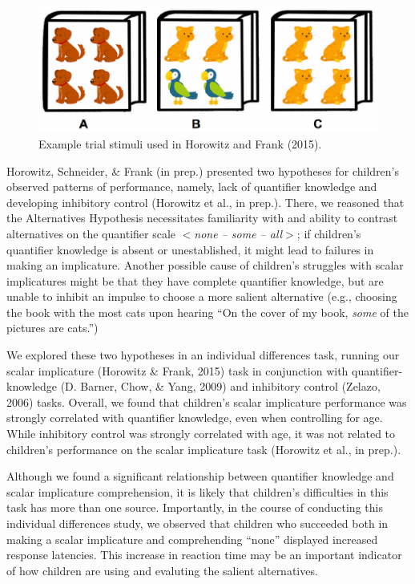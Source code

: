 \documentclass[10pt, letterpaper]{article}
\newenvironment{CodeChunk}{}{}
\begin{document}
\begin{CodeChunk}
\begin{figure}[b]

{\centering \includegraphics{figs/image-1} 

}

\caption[Example trial stimuli used in Horowitz and Frank (2015)]{Example trial stimuli used in Horowitz and Frank (2015).}\label{fig:image}
\end{figure}
\end{CodeChunk}

Horowitz, Schneider, \& Frank (in prep.) presented two hypotheses for
children's observed patterns of performance, namely, lack of quantifier
knowledge and developing inhibitory control (Horowitz et al., in prep.).
There, we reasoned that the Alternatives Hypothesis necessitates
familiarity with and ability to contrast alternatives on the quantifier
scale \(<\)\emph{none -- some -- all}\(>\); if children's quantifier
knowledge is absent or unestablished, it might lead to failures in
making an implicature. Another possible cause of children's struggles
with scalar implicatures might be that they have complete quantifier
knowledge, but are unable to inhibit an impulse to choose a more salient
alternative (e.g., choosing the book with the most cats upon hearing
``On the cover of my book, \emph{some} of the pictures are cats.'')

We explored these two hypotheses in an individual differences task,
running our scalar implicature (Horowitz \& Frank, 2015) task in
conjunction with quantifier-knowledge (D. Barner, Chow, \& Yang, 2009)
and inhibitory control (Zelazo, 2006) tasks. Overall, we found that
children's scalar implicature performance was strongly correlated with
quantifier knowledge, even when controlling for age. While inhibitory
control was strongly correlated with age, it was not related to
children's performance on the scalar implicature task (Horowitz et al.,
in prep.).

Although we found a significant relationship between quantifier
knowledge and scalar implicature comprehension, it is likely that
children's difficulties in this task has more than one source.
Importantly, in the course of conducting this individual differences
study, we observed that children who succeeded both in making a scalar
implicature and comprehending ``none'' displayed increased response
latencies. This increase in reaction time may be an important indicator
of how children are using and evaluting the salient alternatives.
\end{document}
